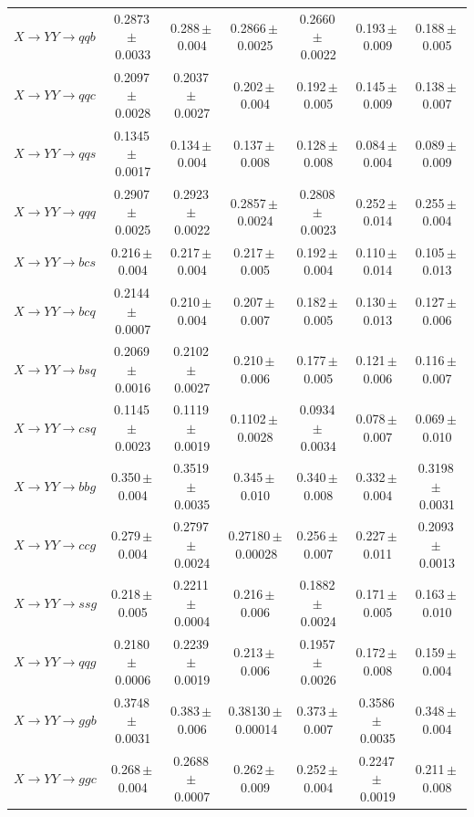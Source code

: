 \begin{landscape}
{\begin{longtable}{@{\extracolsep{\fill}}lcccccc@{}}
$X\to YY\to qqb$ & 0.2873\,$\pm$\,0.0033 & 0.288\,$\pm$\,0.004 & 0.2866\,$\pm$\,0.0025 & 0.2660\,$\pm$\,0.0022 & 0.193\,$\pm$\,0.009 & 0.188\,$\pm$\,0.005 \\
$X\to YY\to qqc$ & 0.2097\,$\pm$\,0.0028 & 0.2037\,$\pm$\,0.0027 & 0.202\,$\pm$\,0.004 & 0.192\,$\pm$\,0.005 & 0.145\,$\pm$\,0.009 & 0.138\,$\pm$\,0.007 \\
$X\to YY\to qqs$ & 0.1345\,$\pm$\,0.0017 & 0.134\,$\pm$\,0.004 & 0.137\,$\pm$\,0.008 & 0.128\,$\pm$\,0.008 & 0.084\,$\pm$\,0.004 & 0.089\,$\pm$\,0.009 \\
$X\to YY\to qqq$ & 0.2907\,$\pm$\,0.0025 & 0.2923\,$\pm$\,0.0022 & 0.2857\,$\pm$\,0.0024 & 0.2808\,$\pm$\,0.0023 & 0.252\,$\pm$\,0.014 & 0.255\,$\pm$\,0.004 \\
$X\to YY\to bcs$ & 0.216\,$\pm$\,0.004 & 0.217\,$\pm$\,0.004 & 0.217\,$\pm$\,0.005 & 0.192\,$\pm$\,0.004 & 0.110\,$\pm$\,0.014 & 0.105\,$\pm$\,0.013 \\
$X\to YY\to bcq$ & 0.2144\,$\pm$\,0.0007 & 0.210\,$\pm$\,0.004 & 0.207\,$\pm$\,0.007 & 0.182\,$\pm$\,0.005 & 0.130\,$\pm$\,0.013 & 0.127\,$\pm$\,0.006 \\
$X\to YY\to bsq$ & 0.2069\,$\pm$\,0.0016 & 0.2102\,$\pm$\,0.0027 & 0.210\,$\pm$\,0.006 & 0.177\,$\pm$\,0.005 & 0.121\,$\pm$\,0.006 & 0.116\,$\pm$\,0.007 \\
$X\to YY\to csq$ & 0.1145\,$\pm$\,0.0023 & 0.1119\,$\pm$\,0.0019 & 0.1102\,$\pm$\,0.0028 & 0.0934\,$\pm$\,0.0034 & 0.078\,$\pm$\,0.007 & 0.069\,$\pm$\,0.010 \\
$X\to YY\to bbg$ & 0.350\,$\pm$\,0.004 & 0.3519\,$\pm$\,0.0035 & 0.345\,$\pm$\,0.010 & 0.340\,$\pm$\,0.008 & 0.332\,$\pm$\,0.004 & 0.3198\,$\pm$\,0.0031 \\
$X\to YY\to ccg$ & 0.279\,$\pm$\,0.004 & 0.2797\,$\pm$\,0.0024 & 0.27180\,$\pm$\,0.00028 & 0.256\,$\pm$\,0.007 & 0.227\,$\pm$\,0.011 & 0.2093\,$\pm$\,0.0013 \\
$X\to YY\to ssg$ & 0.218\,$\pm$\,0.005 & 0.2211\,$\pm$\,0.0004 & 0.216\,$\pm$\,0.006 & 0.1882\,$\pm$\,0.0024 & 0.171\,$\pm$\,0.005 & 0.163\,$\pm$\,0.010 \\
$X\to YY\to qqg$ & 0.2180\,$\pm$\,0.0006 & 0.2239\,$\pm$\,0.0019 & 0.213\,$\pm$\,0.006 & 0.1957\,$\pm$\,0.0026 & 0.172\,$\pm$\,0.008 & 0.159\,$\pm$\,0.004 \\
$X\to YY\to ggb$ & 0.3748\,$\pm$\,0.0031 & 0.383\,$\pm$\,0.006 & 0.38130\,$\pm$\,0.00014 & 0.373\,$\pm$\,0.007 & 0.3586\,$\pm$\,0.0035 & 0.348\,$\pm$\,0.004 \\
$X\to YY\to ggc$ & 0.268\,$\pm$\,0.004 & 0.2688\,$\pm$\,0.0007 & 0.262\,$\pm$\,0.009 & 0.252\,$\pm$\,0.004 & 0.2247\,$\pm$\,0.0019 & 0.211\,$\pm$\,0.008 \\

\end{longtable}}
\end{landscape}

